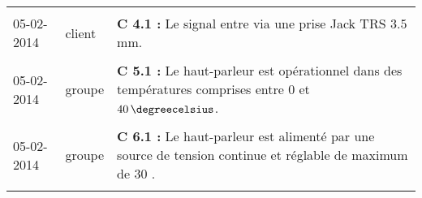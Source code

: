 \begin{tabular}{|p{2cm}|p{1.5cm}|p{13.2cm}|}
	& &\\
	 	05-02-2014 & client & \textbf{C 4.1 :} Le signal entre via une prise Jack TRS $3.5$ mm.\\
	& &\\
		05-02-2014 & groupe & \textbf{C 5.1 :} Le haut-parleur est opérationnel dans des températures comprises entre $0$ et $40\,\degreecelsius$.\\
	& &\\
		05-02-2014 & groupe & \textbf{C 6.1 :} Le haut-parleur est alimenté par une source de tension continue et réglable de maximum de $30$ \volt.\\
	 & &\\
\hline
 \end{tabular}
